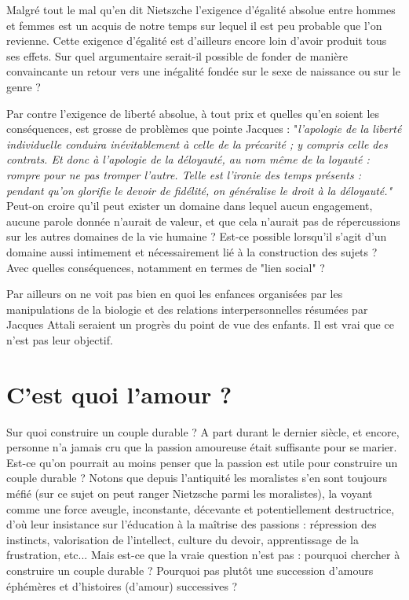  Malgré tout le mal qu'en dit Nietszche l'exigence d'égalité absolue entre hommes et femmes est un acquis de notre temps sur lequel il est peu probable que l'on revienne. Cette exigence d'égalité est d'ailleurs encore loin d'avoir produit tous ses effets. Sur quel argumentaire serait-il possible de fonder de manière convaincante un retour vers une inégalité fondée sur le sexe de naissance ou sur le genre ? 
 
 Par contre l'exigence de liberté absolue, à tout prix et quelles qu'en soient les conséquences, est grosse de problèmes que pointe Jacques  : "\emph{l'apologie de la liberté individuelle conduira inévitablement à celle de la précarité ; y compris celle des contrats. Et donc à l'apologie de la déloyauté, au nom même de la loyauté : rompre pour ne pas tromper l'autre. Telle est l'ironie des temps présents : pendant qu'on glorifie le devoir de fidélité, on généralise le droit à la déloyauté."} Peut-on croire qu'il peut exister un domaine  dans lequel aucun engagement, aucune parole donnée n'aurait de valeur, et que cela n'aurait pas de répercussions sur les autres domaines de la vie humaine ? Est-ce possible lorsqu'il s'agit d'un domaine aussi intimement et nécessairement lié à la construction des sujets ? Avec quelles conséquences, notamment en termes de "lien social" ?
 
 
 Par ailleurs on ne voit pas bien en quoi les enfances organisées par les manipulations de la biologie et des relations interpersonnelles résumées par Jacques Attali seraient un progrès du point de vue des enfants. Il est vrai que ce n'est pas leur objectif. 
 
 \section{C'est quoi l'amour ?}
 
 Sur quoi construire un couple durable ? A part durant le dernier siècle, et encore, personne n'a jamais cru que la passion amoureuse était suffisante pour se marier. 
 Est-ce qu'on pourrait au moins penser que la passion est utile pour construire un couple durable ? Notons que depuis l'antiquité les moralistes s'en sont toujours méfié (sur ce sujet on peut ranger Nietzsche parmi les moralistes), la voyant comme une force aveugle, inconstante, décevante et potentiellement destructrice, d'où leur insistance sur l'éducation à la maîtrise des passions : répression des instincts, valorisation de l'intellect, culture du devoir, apprentissage de la frustration, etc... 
 Mais est-ce que la vraie question n'est pas : pourquoi chercher à construire un couple durable ? 
 Pourquoi pas plutôt une succession d'amours éphémères et d'histoires (d'amour) successives ?
 
